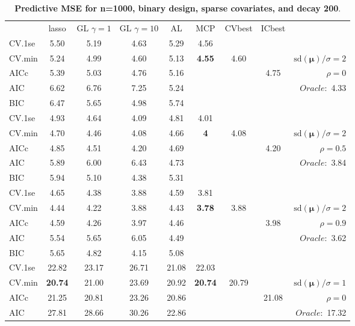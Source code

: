 \clearpage
\begin{table}\vspace{-.5cm}
\caption[l]{ { \bf Predictive MSE for n=1000, binary design, 
sparse covariates, and  decay  200}.}
\vspace{-.5cm}
\footnotesize{}
\begin{center}
\begin{tabular}{l*{7}{c}|r}
 & lasso & GL $\gamma=1$ & GL $\gamma=10$ & AL & MCP  & CVbest & ICbest  \\
\cline{1-9}
CV.1se & 5.50 & 5.19 & 4.63 & 5.29 & 4.56 & & & \\
CV.min & 5.24 & 4.99 & 4.60 & 5.13 & {\bf 4.55} & 4.60 & & $\mathrm{sd}(\mathbf{\mu})/\sigma=2$ \\
AICc & 5.39 & 5.03 & 4.76 & 5.16 & & & 4.75 &  $\rho=0$ \\
AIC & 6.62 & 6.76 & 7.25 & 5.24 & & & &  \multirow{2}{*}{$Oracle: $ 4.33} \\
BIC & 6.47 & 5.65 & 4.98 & 5.74 & & & &  \\
 \hline 
CV.1se & 4.93 & 4.64 & 4.09 & 4.81 & 4.01 & & & \\
CV.min & 4.70 & 4.46 & 4.08 & 4.66 & {\bf 4} & 4.08 & & $\mathrm{sd}(\mathbf{\mu})/\sigma=2$ \\
AICc & 4.85 & 4.51 & 4.20 & 4.69 & & & 4.20 &  $\rho=0.5$ \\
AIC & 5.89 & 6.00 & 6.43 & 4.73 & & & &  \multirow{2}{*}{$Oracle: $ 3.84} \\
BIC & 5.94 & 5.10 & 4.38 & 5.31 & & & &  \\
 \hline 
CV.1se & 4.65 & 4.38 & 3.88 & 4.59 & 3.81 & & & \\
CV.min & 4.44 & 4.22 & 3.88 & 4.43 & {\bf 3.78} & 3.88 & & $\mathrm{sd}(\mathbf{\mu})/\sigma=2$ \\
AICc & 4.59 & 4.26 & 3.97 & 4.46 & & & 3.98 &  $\rho=0.9$ \\
AIC & 5.54 & 5.65 & 6.05 & 4.49 & & & &  \multirow{2}{*}{$Oracle: $ 3.62} \\
BIC & 5.65 & 4.82 & 4.15 & 5.08 & & & &  \\
 \hline 
CV.1se & 22.82 & 23.17 & 26.71 & 21.08 & 22.03 & & & \\
CV.min & {\bf 20.74} & 21.00 & 23.69 & 20.92 & {\bf 20.74} & 20.79 & & $\mathrm{sd}(\mathbf{\mu})/\sigma=1$ \\
AICc & 21.25 & 20.81 & 23.26 & 20.86 & & & 21.08 &  $\rho=0$ \\
AIC & 27.81 & 28.66 & 30.26 & 22.86 & & & &  \multirow{2}{*}{$Oracle: $ 17.32} \\

\end{tabular}
\end{center}
\end{table}
